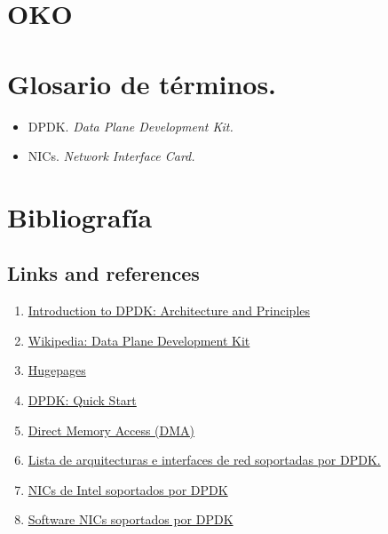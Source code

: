\documentclass[12pt]{article}
\begin{document}
    \pagebreak
    \section{OKO}
    
    \pagebreak
    \section{Glosario de términos.}
    \begin{itemize}
    	\item DPDK. \textit{Data Plane Development Kit.}
    	\item NICs. \textit{Network Interface Card.}
    \end{itemize}
    
    
    \pagebreak
    \section{Bibliografía}
    \subsection{Links and references}
    \begin{enumerate}
        \item 
        \label{bib:link1} \href{https://blog.selectel.com/introduction-dpdk-architecture-principles/}{Introduction to DPDK: Architecture and Principles}
        
        \item 
        \label{bib:link2}\href{https://en.wikipedia.org/wiki/Data_Plane_Development_Kit}{Wikipedia: Data Plane Development Kit}
        
        \item 
        \label{bib:link3}\href{https://wiki.debian.org/Hugepages}{Hugepages}
        
        \item
        \label{bib:link4}\href{https://core.dpdk.org/doc/quick-start/}{DPDK: Quick Start}
        
        \item
        \label{bib:link5} \href{https://techopedia.com/definition/2767/direct-memory-access-dma}{Direct Memory Access (DMA)}
        
        \item
        \label{bib:link6} \href{https://core.dpdk.org/supported/}{Lista de arquitecturas e interfaces de red soportadas por DPDK.}
        
        \item
        \label{bib:link7} \href{https://core.dpdk.org/supported/nics/intel/}{NICs de Intel soportados por DPDK}
        
        \item
        \label{bib:link8} \href{https://core.dpdk.org/supported/nics/sw/}{Software NICs soportados por DPDK}
    \end{enumerate}
\end{document}
